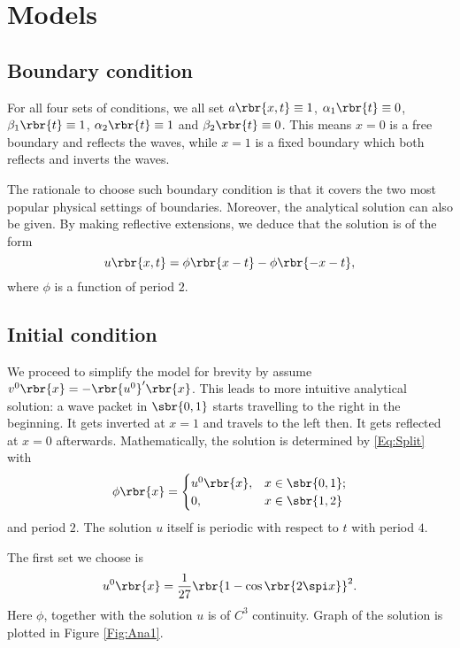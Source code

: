 \documentclass[english, nochinese]{pnote}
\begin{document}
\section{Models}

\subsection{Boundary condition}

For all four sets of conditions, we all set $ a \rbr{ x, t } \equiv 1 $, $ \alpha_1 \rbr{t} \equiv 0 $, $ \beta_1 \rbr{t} \equiv 1 $, $ \alpha_2 \rbr{t} \equiv 1 $ and $ \beta_2 \rbr{t} \equiv 0 $. This means $ x = 0 $ is a free boundary and reflects the waves, while $ x = 1 $ is a fixed boundary which both reflects and inverts the waves.

The rationale to choose such boundary condition is that it covers the two most popular physical settings of boundaries. Moreover, the analytical solution can also be given. By making reflective extensions, we deduce that the solution is of the form
\begin{equation} \label{Eq:Split}
u \rbr{ x, t } = \phi \rbr{ x - t } - \phi \rbr{ -x - t },
\end{equation}
where $\phi$ is a function of period $2$.

\subsection{Initial condition}

We proceed to simplify the model for brevity by assume $ v^0 \rbr{x} = -\rbr{u^0}' \rbr{x} $. This leads to more intuitive analytical solution: a wave packet in $ \sbr{ 0, 1 } $ starts travelling to the right in the beginning. It gets inverted at $ x = 1 $ and travels to the left then. It gets reflected at $ x = 0 $ afterwards. Mathematically, the solution is determined by \eqref{Eq:Split} with
\begin{equation}
\phi \rbr{x} =
\begin{cases}
u^0 \rbr{x}, & x \in \sbr{ 0, 1 }; \\
0, & x \in \sbr{ 1, 2 }
\end{cases}
\end{equation}
and period $2$. The solution $u$ itself is periodic with respect to $t$ with period $4$.

The first set we choose is
\begin{equation}
u^0 \rbr{x} = \frac{1}{27} \rbr{ 1 - \cos \rbr{ 2 \spi x } }^2.
\end{equation}
Here $\phi$, together with the solution $u$ is of $C^3$ continuity. Graph of the solution is plotted in Figure \ref{Fig:Ana1}.
\end{document}
